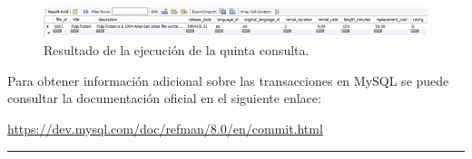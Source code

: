 \documentclass[a4paper]{article}
\begin{document}
\begin{figure}[ht]
    \centering
    \includegraphics[width=0.9\columnwidth]{figs/5consulta.png}
    \caption{Resultado de la ejecución de la quinta consulta.}\label{fig:5consulta}
\end{figure}

Para obtener información adicional sobre las transacciones en MySQL se puede consultar la documentación oficial en el siguiente enlace:

\url{https://dev.mysql.com/doc/refman/8.0/en/commit.html}

\vspace{4em}
\hrule
\doclicenseThis
\end{document}
